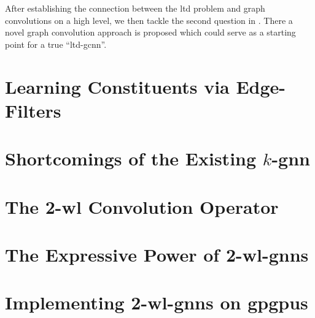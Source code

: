 After establishing the connection between the \acs{ltd} problem and graph convolutions on a high level, we then tackle the second question in .
There a novel graph convolution approach is proposed which could serve as a starting point for a true ``\ac{ltd}-\ac{gcnn}''.

\section{Learning Constituents via Edge-Filters}%
\label{sec:ltd:edge-filter}

\section{Shortcomings of the Existing $k$-\acs*{gnn}}%
\label{sec:ltd:kgnn-problems}

\section{The 2-\acs*{wl} Convolution Operator}%
\label{sec:ltd:wl2gnn-definition}

\section{The Expressive Power of 2-\acs*{wl}-\acsp*{gnn}}%
\label{sec:ltd:wl2gnn-properties}

\section{Implementing 2-\acs*{wl}-\acsp*{gnn} on \acsp*{gpgpu}}%
\label{sec:ltd:wl2gnn-implementation}

